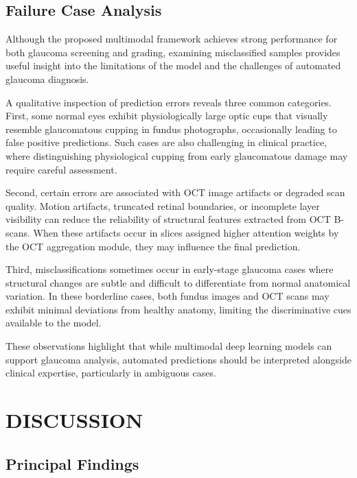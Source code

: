 \documentclass[preprint,12pt]{elsarticle}
\begin{document}
\subsection{Failure Case Analysis}

Although the proposed multimodal framework achieves strong performance for both glaucoma screening and grading, examining misclassified samples provides useful insight into the limitations of the model and the challenges of automated glaucoma diagnosis.

A qualitative inspection of prediction errors reveals three common categories. First, some normal eyes exhibit physiologically large optic cups that visually resemble glaucomatous cupping in fundus photographs, occasionally leading to false positive predictions. Such cases are also challenging in clinical practice, where distinguishing physiological cupping from early glaucomatous damage may require careful assessment.

Second, certain errors are associated with OCT image artifacts or degraded scan quality. Motion artifacts, truncated retinal boundaries, or incomplete layer visibility can reduce the reliability of structural features extracted from OCT B-scans. When these artifacts occur in slices assigned higher attention weights by the OCT aggregation module, they may influence the final prediction.

Third, misclassifications sometimes occur in early-stage glaucoma cases where structural changes are subtle and difficult to differentiate from normal anatomical variation. In these borderline cases, both fundus images and OCT scans may exhibit minimal deviations from healthy anatomy, limiting the discriminative cues available to the model.

These observations highlight that while multimodal deep learning models can support glaucoma analysis, automated predictions should be interpreted alongside clinical expertise, particularly in ambiguous cases.

\section{DISCUSSION}

\subsection{Principal Findings}
\end{document}

